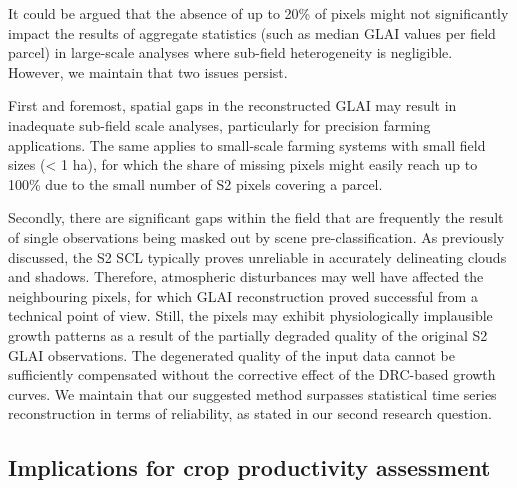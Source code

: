 It could be argued that the absence of up to 20\% of pixels might not significantly impact the results of aggregate statistics (such as median \gls{GLAI} values per field parcel) in large-scale analyses where sub-field heterogeneity is negligible. However, we maintain that two issues persist.

First and foremost, spatial gaps in the reconstructed \gls{GLAI} may result in inadequate sub-field scale analyses, particularly for precision farming applications. The same applies to small-scale farming systems with small field sizes (< 1 ha), for which the share of missing pixels might easily reach up to 100\% due to the small number of \gls{S2} pixels covering a parcel.

Secondly, there are significant gaps within the field that are frequently the result of single observations being masked out by scene pre-classification. As previously discussed, the \gls{S2} \gls{SCL} typically proves unreliable in accurately delineating clouds and shadows. Therefore, atmospheric disturbances may well have affected the neighbouring pixels, for which GLAI reconstruction proved successful from a technical point of view. Still, the pixels may exhibit physiologically implausible growth patterns as a result of the partially degraded quality of the original \gls{S2} \gls{GLAI} observations. The degenerated quality of the input data cannot be sufficiently compensated without the corrective effect of the \gls{DRC}-based growth curves. We maintain that our suggested method surpasses statistical time series reconstruction in terms of reliability, as stated in our second research question.

\subsection{Implications for crop productivity assessment}

